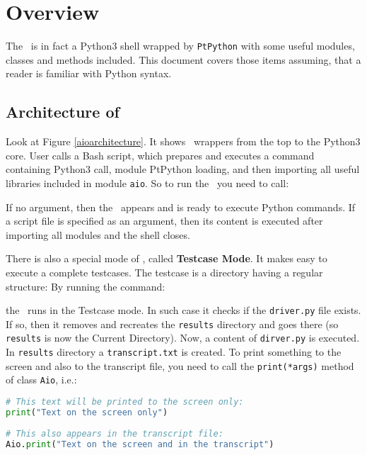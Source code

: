 \chapter{Overview}

The \ShellName\ is in fact a Python3 shell wrapped by \texttt{PtPython} with some useful modules, classes and methods included. This document covers those items assuming, that a reader is familiar with Python syntax.

\section{Architecture of \ShellName}

Look at Figure \ref{aioarchitecture}. It shows \ShellName\ wrappers from the top to the Python3 core. User calls a Bash script, which prepares and executes a command containing Python3 call, module PtPython loading, and then importing all useful libraries included in module \texttt{aio}. So to run the \ShellName\ you need to call:
\begin{alltt}
\end{alltt}
If no argument, then the \ShellName\ appears and is ready to execute Python commands. If a script file is specified as an argument, then its content is executed after importing all modules and the shell closes. 



There is also a special mode of \ShellName, called \textbf{Testcase Mode}. It makes easy to execute a complete testcases. The testcase is a directory having a regular structure:
By running the command:
\begin{alltt}
	\daio
\end{alltt}
the \ShellName\ runs in the Testcase mode. In such case it checks if the \texttt{driver.py} file exists. If so, then it removes and recreates the \texttt{results} directory and goes there (so \texttt{results} is now the Current Directory). Now, a content of \texttt{dirver.py} is executed. In \texttt{results} directory a \texttt{transcript.txt} is created. To print something to the screen and also to the transcript file, you need to call the \texttt{print(*args)} method of class \texttt{Aio}, i.e.:
\begin{lstlisting}[language=Python]
# This text will be printed to the screen only:
print("Text on the screen only")
	
# This also appears in the transcript file:
Aio.print("Text on the screen and in the transcript")
\end{lstlisting} 

